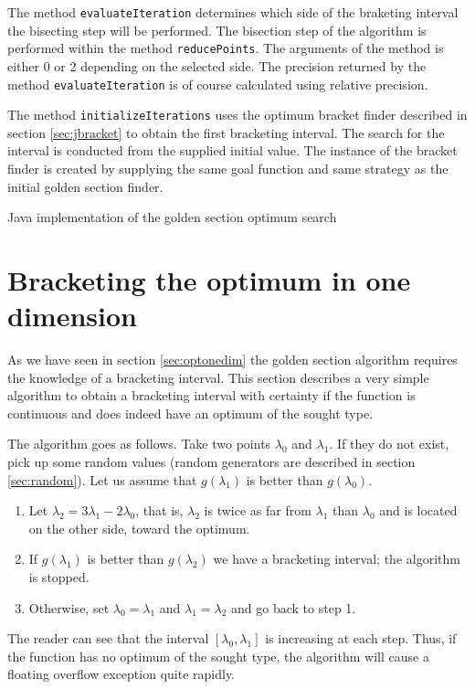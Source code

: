 \documentclass[twoside]{book}
\begin{document}
The method {\tt evaluateIteration} determines which side of the
braketing interval the bisecting step will be performed. The
bisection step of the algorithm is performed within the method
{\tt reducePoints}. The arguments of the method is either 0 or 2
depending on the selected side. The precision returned by the
method {\tt evaluateIteration} is of course calculated using
relative precision.

The method {\tt initializeIterations} uses the optimum bracket
finder described in section \ref{sec:jbracket} to obtain the first
bracketing interval. The search for the interval is conducted from
the supplied initial value. The instance of the bracket finder is
created by supplying the same goal function and same strategy as
the initial golden section finder.

\begin{listing} Java implementation of the golden section optimum search
\label{lj:optimizerOneDim}

\end{listing}

\section{Bracketing the optimum in one dimension}
\label{sec:bracket} As we have seen in section \ref{sec:optonedim}
the golden section algorithm requires the knowledge of a
bracketing interval. This section describes a very simple
algorithm to obtain a bracketing interval with certainty if the
function is continuous and does indeed have an optimum of the
sought type.

The algorithm goes as follows. Take two points $\lambda_0$ and
$\lambda_1$. If they do not exist, pick up some random values
(random generators are described in section \ref{sec:random}). Let
us assume that $g\left(\lambda_1\right)$ is better than
$g\left(\lambda_0\right)$.
\begin{enumerate}
  \item Let $\lambda_2=3\lambda_1-2\lambda_0$, that is, $\lambda_2$ is twice as far from $\lambda_1$ than
$\lambda_0$ and is located on the other side, toward the optimum.
  \item If $g\left(\lambda_1\right)$ is better than
$g\left(\lambda_2\right)$ we have a bracketing interval; the
algorithm is stopped.
  \item Otherwise, set $\lambda_0=\lambda_1$ and $\lambda_1=\lambda_2$ and go back to step 1.
\end{enumerate}
The reader can see that the interval
$\left[\lambda_0,\lambda_1\right]$ is increasing at each step.
Thus, if the function has no optimum of the sought type, the
algorithm will cause a floating overflow exception quite rapidly.
\end{document}
